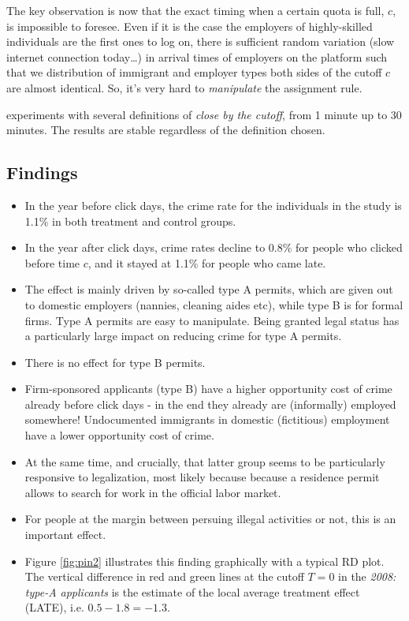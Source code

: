 \documentclass[]{book}
\providecommand{\tightlist}{%
  \setlength{\itemsep}{0pt}\setlength{\parskip}{0pt}}
\begin{document}
The key observation is now that the exact timing when a certain quota is full, \(c\), is impossible to foresee. Even if it is the case the employers of highly-skilled individuals are the first ones to log on, there is sufficient random variation (slow internet connection today\ldots{}) in arrival times of employers on the platform such that we distribution of immigrant and employer types both sides of the cutoff \(c\) are almost identical. So, it's very hard to \emph{manipulate} the assignment rule.

\citet{pinotti} experiments with several definitions of \emph{close by the cutoff}, from 1 minute up to 30 minutes. The results are stable regardless of the definition chosen.

\hypertarget{findings}{%
\subsection{Findings}\label{findings}}

\begin{itemize}
\tightlist
\item
  In the year before click days, the crime rate for the individuals in the study is 1.1\% in both treatment and control groups.
\item
  In the year after click days, crime rates decline to 0.8\% for people who clicked before time \(c\), and it stayed at 1.1\% for people who came late.
\item
  The effect is mainly driven by so-called type A permits, which are given out to domestic employers (nannies, cleaning aides etc), while type B is for formal firms. Type A permits are easy to manipulate. Being granted legal status has a particularly large impact on reducing crime for type A permits.
\item
  There is no effect for type B permits.
\item
  Firm-sponsored applicants (type B) have a higher opportunity cost of crime already before click days - in the end they already are (informally) employed somewhere! Undocumented immigrants in domestic (fictitious) employment have a lower opportunity cost of crime.
\item
  At the same time, and crucially, that latter group seems to be particularly responsive to legalization, most likely because because a residence permit allows to search for work in the official labor market.
\item
  For people at the margin between persuing illegal activities or not, this is an important effect.
\item
  Figure \ref{fig:pin2} illustrates this finding graphically with a typical RD plot. The vertical difference in red and green lines at the cutoff \(T=0\) in the \emph{2008: type-A applicants} is the estimate of the local average treatment effect (LATE), i.e. \(0.5 - 1.8 = -1.3\).
\end{itemize}
\end{document}
